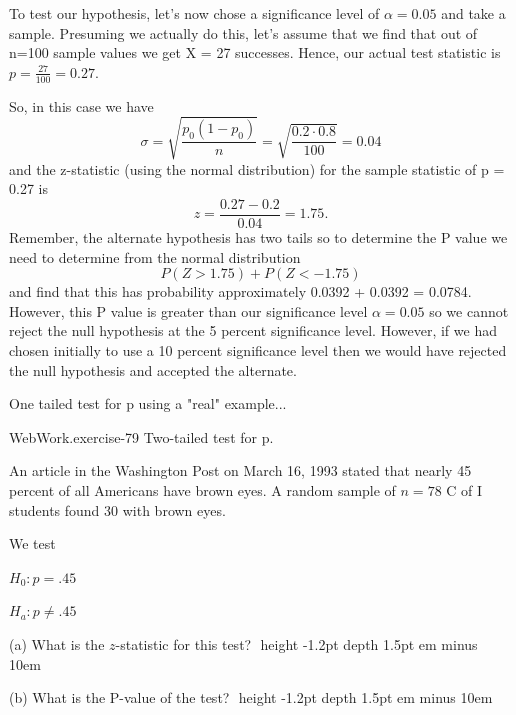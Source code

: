 \documentclass[10pt,]{book}
\newcommand{\fillin}[1]{\leavevmode\leaders\vrule height -1.2pt depth 1.5pt \hskip #1em minus #1em \null}
\numberwithin{equation}{section}
\newcommand{\lt}{<}
\newcommand{\gt}{>}
\begin{document}
\par
\hypertarget{p-1175}{}%
To test our hypothesis, let's now chose a significance level of \(\alpha = 0.05\) and take a sample. Presuming we actually do this, let's assume that we find that out of n=100 sample values we get X = 27 successes. Hence, our actual test statistic is \(p = \frac{27}{100} = 0.27\).%
\par
\hypertarget{p-1176}{}%
So, in this case we have%
\begin{equation*}
\sigma = \sqrt{\frac{p_0(1-p_0)}{n}} = \sqrt{\frac{0.2 \cdot 0.8}{100}} = 0.04
\end{equation*}
and the z-statistic (using the normal distribution) for the sample statistic of p = 0.27 is%
\begin{equation*}
z = \frac{0.27 - 0.2}{0.04} = 1.75.
\end{equation*}
Remember, the alternate hypothesis has two tails so to determine the P value we need to determine from the normal distribution%
\begin{equation*}
P(Z \gt 1.75) + P(Z \lt -1.75)
\end{equation*}
and find that this has probability approximately 0.0392 + 0.0392 = 0.0784.  However, this P value is greater than our significance level \(\alpha = 0.05\) so we cannot reject the null hypothesis at the 5 percent significance level. However, if we had chosen initially to use a 10 percent significance level then we would have rejected the null hypothesis and accepted the alternate.%
\par
\hypertarget{p-1177}{}%
One tailed test for p using a "real" example...%
\par
\hypertarget{p-1178}{}%
\begin{inlineexercise}{WebWork.}{exercise-79}%
\hypertarget{p-1179}{}%
Two-tailed test for p.%
\par\medskip
\hypertarget{p-1180}{}%
An article in the Washington Post on March 16, 1993 stated that nearly 45 percent of  all Americans have brown eyes.  A random sample of \(n = 
78\) C of I students found 30 with brown eyes.%
\par
\hypertarget{p-1181}{}%
We test%
\par
\hypertarget{p-1182}{}%
\(H_0: p = .45\)%
\par
\hypertarget{p-1183}{}%
\(H_a: p \neq .45\)%
\par
\hypertarget{p-1184}{}%
(a) What is the \(z\)-statistic for this test? \(\)  \fillin{10}%
\par
\hypertarget{p-1185}{}%
(b) What is the P-value of the test?  \(\)  \fillin{10}%
\end{inlineexercise}
\end{document}
